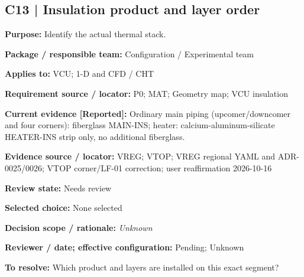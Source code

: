 \documentclass[11pt]{article}
\begin{document}
\par\noindent\begin{minipage}{\textwidth}\small\setlength{\parskip}{2pt}
\subsection*{C13 | Insulation product and layer order}
\textbf{Purpose:} Identify the actual thermal stack.\par
\textbf{Package / responsible team:} Configuration / Experimental team\par
\textbf{Applies to:} VCU; 1-D and CFD / CHT\par
\textbf{Requirement source / locator:} P0; MAT; Geometry map; VCU insulation\par
\textbf{Current evidence [Reported]:} Ordinary main piping (upcomer/downcomer and four corners): fiberglass MAIN-INS; heater: calcium-aluminum-silicate HEATER-INS strip only, no additional fiberglass.\par
\textbf{Evidence source / locator:} VREG; VTOP; VREG regional YAML and ADR-0025/0026; VTOP corner/LF-01 correction; user reaffirmation 2026-10-16\par
\textbf{Review state:} Needs review\par
\textbf{Selected choice:} None selected\par
\textbf{Decision scope / rationale:} \textit{Unknown}\par
\textbf{Reviewer / date; effective configuration:} Pending; Unknown\par
\textbf{To resolve:} Which product and layers are installed on this exact segment?\par
\end{minipage}\par\vspace{5pt}
\end{document}
